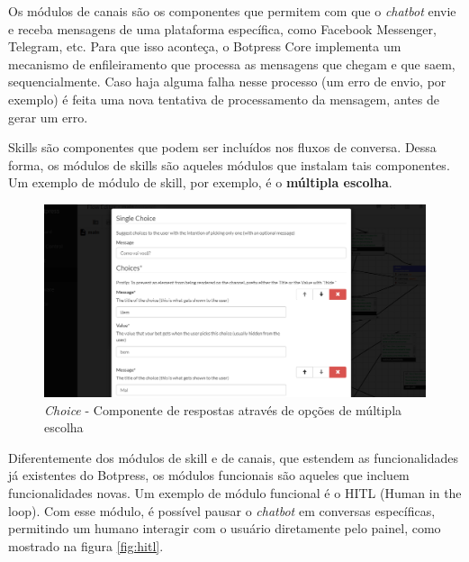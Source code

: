   Os módulos de canais são os componentes que permitem com que o \textit{chatbot} envie e receba mensagens de uma plataforma específica, como Facebook Messenger, Telegram, etc. Para que isso aconteça, o Botpress Core implementa um mecanismo de enfileiramento que processa as mensagens que chegam e que saem, sequencialmente. Caso haja alguma falha nesse processo (um erro de envio, por exemplo) é feita uma nova tentativa de processamento da mensagem, antes de gerar um erro.
  
  Skills são componentes que podem ser incluídos nos fluxos de conversa. Dessa forma, os módulos de skills são aqueles módulos que instalam tais componentes. Um exemplo de módulo de skill, por exemplo, é o \textbf{múltipla escolha}.
  
  \begin{figure}[h!]
  	\begin{center}
  		\includegraphics[width=0.95\linewidth]{images/choice.png}
  		\caption{\textit{Choice} - Componente de respostas através de opções de múltipla escolha}
  		\label{fig:choice}
  	\end{center}
  \end{figure}
  
  Diferentemente dos módulos de skill e de canais, que estendem as funcionalidades já existentes do Botpress, os módulos funcionais são aqueles que incluem funcionalidades novas. Um exemplo de módulo funcional é o HITL (Human in the loop). Com esse módulo, é possível pausar o \textit{chatbot} em conversas específicas, permitindo um humano interagir com o usuário diretamente pelo painel, como mostrado na figura \ref{fig:hitl}.
  
